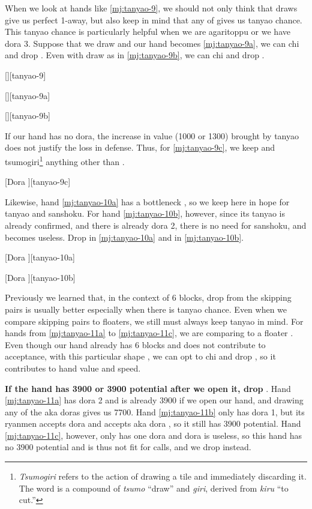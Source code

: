 \documentclass[12pt]{article}
\begin{document}
When we look at hands like \ref{mj:tanyao-9}, we should not only think that  draws give us perfect 1-away, but also keep in mind that any of  gives us tanyao chance. This tanyao chance is particularly helpful when we are agaritoppu or we have dora 3. Suppose that we draw  and our hand becomes \ref{mj:tanyao-9a}, we can chi  and drop . Even with  draw as in \ref{mj:tanyao-9b}, we can chi  and drop .

[][tanyao-9]

[][tanyao-9a]

[][tanyao-9b]

If our hand has no dora, the increase in value (1000 or 1300) brought by tanyao does not justify the loss in defense. Thus, for \ref{mj:tanyao-9c}, we keep  and tsumogiri\footnote{\textit{Tsumogiri} refers to the action of drawing a tile and immediately discarding it. The word is a compound of \textit{tsumo} ``draw'' and \textit{giri}, derived from \textit{kiru} ``to cut.''} anything other than .

[Dora ][tanyao-9c]

Likewise, hand \ref{mj:tanyao-10a} has a bottleneck , so we keep  here in hope for tanyao and sanshoku. For hand \ref{mj:tanyao-10b}, however, since its tanyao is already confirmed, and there is already dora 2, there is no need for sanshoku, and  becomes useless. Drop  in \ref{mj:tanyao-10a} and  in \ref{mj:tanyao-10b}.

[Dora ][tanyao-10a]

[Dora ][tanyao-10b]

Previously we learned that, in the context of 6 blocks, drop  from the skipping pairs  is usually better especially when there is tanyao chance. Even when we compare skipping pairs to floaters, we still must always keep tanyao in mind. For hands from \ref{mj:tanyao-11a} to \ref{mj:tanyao-11c}, we are comparing  to a floater . Even though our hand already has 6 blocks and  does not contribute to acceptance, with this particular shape , we can opt to chi  and drop , so it contributes to hand value and speed.

\textbf{If the hand has 3900 or 3900 potential after we open it, drop}  \citep[][pp.~165--170]{kawamura-naki}. Hand \ref{mj:tanyao-11a} has dora 2 and is already 3900 if we open our hand, and drawing any of the aka doras gives us 7700. Hand \ref{mj:tanyao-11b} only has dora 1, but its  ryanmen accepts dora  and  accepts aka dora , so it still has 3900 potential. Hand \ref{mj:tanyao-11c}, however, only has one dora and dora  is useless, so this hand has no 3900 potential and is thus not fit for calls, and we drop  instead.
\end{document}

